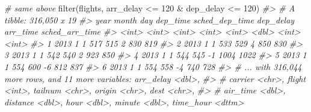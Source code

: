 \documentclass[
]{book}
\newenvironment{Shaded}{\begin{snugshade}}{\end{snugshade}}
\newcommand{\CommentTok}[1]{\textcolor[rgb]{0.56,0.35,0.01}{\textit{#1}}}
\newcommand{\DecValTok}[1]{\textcolor[rgb]{0.00,0.00,0.81}{#1}}
\newcommand{\FunctionTok}[1]{\textcolor[rgb]{0.00,0.00,0.00}{#1}}
\newcommand{\NormalTok}[1]{#1}
\newcommand{\SpecialCharTok}[1]{\textcolor[rgb]{0.00,0.00,0.00}{#1}}
\begin{document}
\begin{Shaded}
\begin{Highlighting}[]
\CommentTok{\# same above}
\FunctionTok{filter}\NormalTok{(flights, arr\_delay }\SpecialCharTok{\textless{}=} \DecValTok{120} \SpecialCharTok{\&}\NormalTok{ dep\_delay }\SpecialCharTok{\textless{}=} \DecValTok{120}\NormalTok{)}
\CommentTok{\#\textgreater{} \# A tibble: 316,050 x 19}
\CommentTok{\#\textgreater{}    year month   day dep\_time sched\_dep\_time dep\_delay arr\_time sched\_arr\_time}
\CommentTok{\#\textgreater{}   \textless{}int\textgreater{} \textless{}int\textgreater{} \textless{}int\textgreater{}    \textless{}int\textgreater{}          \textless{}int\textgreater{}     \textless{}dbl\textgreater{}    \textless{}int\textgreater{}          \textless{}int\textgreater{}}
\CommentTok{\#\textgreater{} 1  2013     1     1      517            515         2      830            819}
\CommentTok{\#\textgreater{} 2  2013     1     1      533            529         4      850            830}
\CommentTok{\#\textgreater{} 3  2013     1     1      542            540         2      923            850}
\CommentTok{\#\textgreater{} 4  2013     1     1      544            545        {-}1     1004           1022}
\CommentTok{\#\textgreater{} 5  2013     1     1      554            600        {-}6      812            837}
\CommentTok{\#\textgreater{} 6  2013     1     1      554            558        {-}4      740            728}
\CommentTok{\#\textgreater{} \# ... with 316,044 more rows, and 11 more variables: arr\_delay \textless{}dbl\textgreater{},}
\CommentTok{\#\textgreater{} \#   carrier \textless{}chr\textgreater{}, flight \textless{}int\textgreater{}, tailnum \textless{}chr\textgreater{}, origin \textless{}chr\textgreater{}, dest \textless{}chr\textgreater{},}
\CommentTok{\#\textgreater{} \#   air\_time \textless{}dbl\textgreater{}, distance \textless{}dbl\textgreater{}, hour \textless{}dbl\textgreater{}, minute \textless{}dbl\textgreater{}, time\_hour \textless{}dttm\textgreater{}}


\end{Highlighting}
\end{Shaded}
\end{document}
